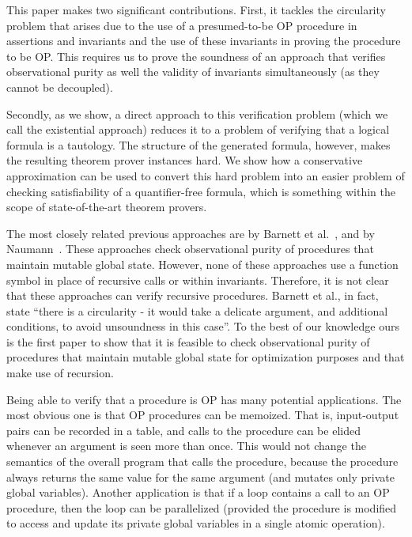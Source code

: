 This paper makes two significant contributions. First, it tackles the
circularity problem that arises due to the use of a presumed-to-be OP
procedure in assertions and invariants and the use of these invariants in
proving the procedure to be OP. This requires us to prove the soundness of
an approach that verifies observational purity as well the validity of
invariants simultaneously (as they cannot be decoupled).

Secondly, as we show, a direct approach to this verification problem (which we
call the existential approach) reduces it to a problem of verifying that a logical formula
is a tautology. The structure of the generated formula, however, makes the resulting
theorem prover instances hard. We show how a conservative approximation can be
used to convert this hard problem into an easier problem of checking satisfiability
of a quantifier-free formula, which is something within the scope of state-of-the-art theorem
provers.


The most closely related previous approaches are by Barnett et
al.~\cite{barnett200499,barnett2006allowing}, and by
Naumann~\cite{naumann2007observational}.  These approaches check observational
purity of procedures that maintain mutable global state. However, none of
these approaches use a function symbol in place of recursive calls or
within invariants. Therefore, it is not clear that these approaches can
verify recursive procedures. 
Barnett et al., in fact, state ``there is a circularity - it would take a delicate argument, and additional conditions,
to avoid unsoundness in this case''.
To the best of our knowledge ours is the first paper to show that it is
feasible to check observational purity of procedures that maintain mutable
global state for optimization purposes and that make use of recursion.


Being able to verify that a procedure is OP has many potential
applications. The most obvious one is that OP procedures can be
memoized. That is, input-output pairs can be recorded in a table, and calls
to the procedure can be elided whenever an argument is seen more than
once. This would not change the semantics of the overall program that calls
the procedure, because the procedure always returns the same value for the
same argument (and mutates only private global variables). Another
application is that if a loop contains a call to an OP procedure, then the
loop can be parallelized (provided the procedure is modified to access and
update its private global variables in a single atomic operation).

